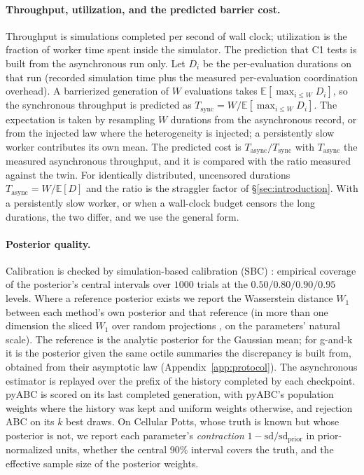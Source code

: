 \documentclass[pdflatex,sn-mathphys-num]{sn-jnl}
\theoremstyle{plain}
\theoremstyle{definition}
\begin{document}
\paragraph{Throughput, utilization, and the predicted barrier cost.} Throughput is simulations completed per second of wall clock; utilization is the fraction of worker time spent inside the simulator. The prediction that C1 tests is built from the asynchronous run only. Let $D_i$ be the per-evaluation durations on that run (recorded simulation time plus the measured per-evaluation coordination overhead). A barrierized generation of $W$ evaluations takes $\mathbb{E}[\max_{i\le W} D_i]$, so the synchronous throughput is predicted as $T_{\mathrm{sync}}=W/\mathbb{E}[\max_{i\le W}D_i]$. The expectation is taken by resampling $W$ durations from the asynchronous record, or from the injected law where the heterogeneity is injected; a persistently slow worker contributes its own mean. The predicted cost is $T_{\mathrm{async}}/T_{\mathrm{sync}}$ with $T_{\mathrm{async}}$ the measured asynchronous throughput, and it is compared with the ratio measured against the twin. For identically distributed, uncensored durations $T_{\mathrm{async}}=W/\mathbb{E}[D]$ and the ratio is the straggler factor of \S\ref{sec:introduction}. With a persistently slow worker, or when a wall-clock budget censors the long durations, the two differ, and we use the general form.

\paragraph{Posterior quality.} Calibration is checked by simulation-based calibration (SBC) \cite{talts2018sbc}: empirical coverage of the posterior's central intervals over $1000$ trials at the $0.50/0.80/0.90/0.95$ levels. Where a reference posterior exists we report the Wasserstein distance $W_1$ between each method's own posterior and that reference (in more than one dimension the sliced $W_1$ over random projections \cite{bonneel2015sliced}, on the parameters' natural scale). The reference is the analytic posterior for the Gaussian mean; for g-and-k it is the posterior given the same octile summaries the discrepancy is built from, obtained from their asymptotic law (Appendix~\ref{app:protocol}). The asynchronous estimator is replayed over the prefix of the history completed by each checkpoint. pyABC is scored on its last completed generation, with pyABC's population weights where the history was kept and uniform weights otherwise, and rejection ABC on its $k$ best draws. On Cellular Potts, whose truth is known but whose posterior is not, we report each parameter's \emph{contraction} $1-\mathrm{sd}/\mathrm{sd}_{\mathrm{prior}}$ in prior-normalized units, whether the central $90\%$ interval covers the truth, and the effective sample size of the posterior weights.
\end{document}
